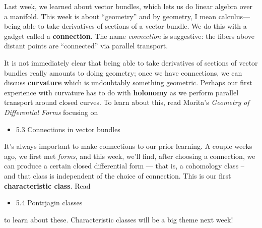 \documentclass{homework}
\author{Jim Fowler}
\date{Week 12: Geometry}
\begin{document}
\maketitle

Last week, we learned about vector bundles, which lets us do linear
algebra over a manifold.  This week is about ``geometry'' and by
geometry, I mean calculus---being able to take derivatives of sections
of a vector bundle.  We do this with a gadget called a
\textbf{connection}.  The name \textit{connection} is suggestive: the
fibers above distant points are ``connected'' via parallel transport.

It is not immediately clear that being able to take derivatives of
sections of vector bundles really amounts to doing geometry; once we
have connections, we can discuss \textbf{curvature} which is
undoubtably something geometric.  Perhaps our first experience with
curvature has to do with \textbf{holonomy} as we perform parallel
transport around closed curves.  To learn about this, read Morita's
\textit{Geometry of Differential Forms} focusing on
\begin{itemize}
\item 5.3 Connections in vector bundles
\end{itemize}

It's always important to make connections to our prior learning.  A couple weeks ago, we first met \textit{forms}, and this week, we'll find, after choosing a connection, we can produce a certain closed differential form --- that is, a cohomology class -- and that class is independent of the choice of connection.  This is our first \textbf{characteristic class}.  Read
\begin{itemize}
\item 5.4 Pontrjagin classes
\end{itemize}
to learn about these.  Characteristic classes will be a big theme next week!
\end{document}
